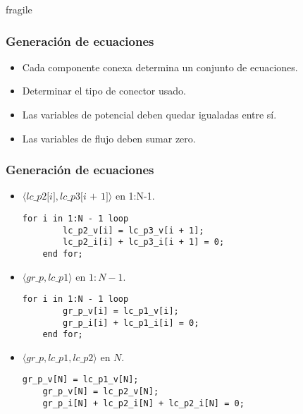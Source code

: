 \begin{frame}{fragile}
\frametitle{Generación de ecuaciones}
\begin{itemize}
\setlength\itemsep{1em}
\item Cada componente conexa determina un conjunto de ecuaciones.
\item Determinar el tipo de conector usado.
\item Las variables de potencial deben quedar igualadas entre sí.
\item Las variables de flujo deben sumar zero. 
\end{itemize}
\end{frame}

\begin{frame}[fragile]
\frametitle{Generación de ecuaciones} 
\begin{itemize}
\item $\langle \textit{lc\_p2[i]},\textit{lc\_p3[i + 1]} \rangle$ en 1:N-1.\\
\begin{lstlisting}[style=base]
    for i in 1:N - 1 loop
        lc_p2_v[i] = lc_p3_v[i + 1];
        lc_p2_i[i] + lc_p3_i[i + 1] = 0;
    end for;
\end{lstlisting}

\item $\langle  \textit{gr\_p} , \textit{lc\_p1} \rangle$ en $1:N-1$. \\
\begin{lstlisting}[style=base]
    for i in 1:N - 1 loop
        gr_p_v[i] = lc_p1_v[i];
        gr_p_i[i] + lc_p1_i[i] = 0;
    end for;
\end{lstlisting}

\item $\langle \textit{gr\_p}, \textit{lc\_p1},\textit{lc\_p2} \rangle$  en $N$. \\
\begin{lstlisting}[style=base]
    gr_p_v[N] = lc_p1_v[N];  
    gr_p_v[N] = lc_p2_v[N];
    gr_p_i[N] + lc_p2_i[N] + lc_p2_i[N] = 0;
\end{lstlisting}
\end{itemize}
\end{frame}
